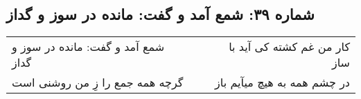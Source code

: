 \begin{center}
\section*{شماره ۳۹: شمع آمد و گفت: مانده در سوز و گداز}
\label{sec:039}
\begin{longtable}{l p{0.5cm} r}
شمع آمد و گفت: مانده در سوز و گداز
&&
کار من غم کشته کی آید با ساز
\\
گرچه همه جمع را زِ من روشنی است
&&
در چشم همه به هیچ میآیم باز
\\
\end{longtable}
\end{center}
